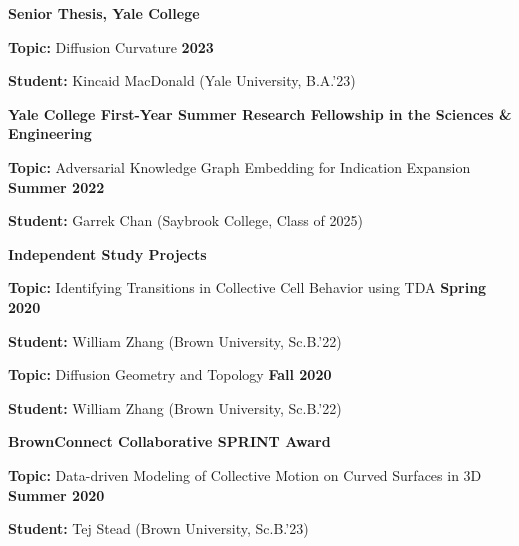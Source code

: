 \documentclass[margin,line]{res}
\newenvironment{list1}{
  \begin{list}{\ding{113}}{
      \setlength{\itemsep}{0in}
      \setlength{\parsep}{0in} \setlength{\parskip}{0in}
      \setlength{\topsep}{0in} \setlength{\partopsep}{0in}
      \setlength{\leftmargin}{0.17in}}}{\end{list}}
\begin{document}
\begin{resume}
{\bf Senior Thesis, Yale College}
\vspace*{.3cm}
\begin{list1}
\setlength\itemsep{0.2em}
\item[] {\bf Topic:} Diffusion Curvature \hfill {\bf \small 2023}
\item[] {\bf Student:} Kincaid MacDonald (Yale University, B.A.'23) 
\end{list1}

{\bf Yale College First-Year Summer Research Fellowship in the Sciences \& Engineering}
\vspace*{.3cm}
\begin{list1}
\setlength\itemsep{0.2em}
\item[] {\bf Topic:} Adversarial Knowledge Graph Embedding for Indication Expansion \hfill {\bf \small Summer 2022}
\item[] {\bf Student:} Garrek Chan (Saybrook College, Class of 2025) 
\end{list1}

{\bf Independent Study Projects}
\vspace*{.3cm}
\begin{list1}
\setlength\itemsep{0.2em}
\item[] {\bf Topic:} Identifying Transitions in Collective Cell Behavior using TDA \hfill {\bf \small Spring 2020}
\item[] {\bf Student:} William Zhang (Brown University, Sc.B.'22) 
\end{list1}
\vspace*{.3cm}
\begin{list1}
\setlength\itemsep{0.2em}
\item[] {\bf Topic:} Diffusion Geometry and Topology \hfill {\bf \small Fall 2020}
\item[] {\bf Student:} William Zhang (Brown University, Sc.B.'22)
\end{list1}


{\bf BrownConnect Collaborative SPRINT Award}
\vspace*{.3cm}
\begin{list1}
\setlength\itemsep{0.2em}
\item[] {\bf Topic:} Data-driven Modeling of Collective Motion on Curved Surfaces in 3D \hfill {\bf \small Summer 2020}
\item[] {\bf Student:} Tej Stead (Brown University, Sc.B.'23)
\end{list1}


\end{resume}
\end{document}
